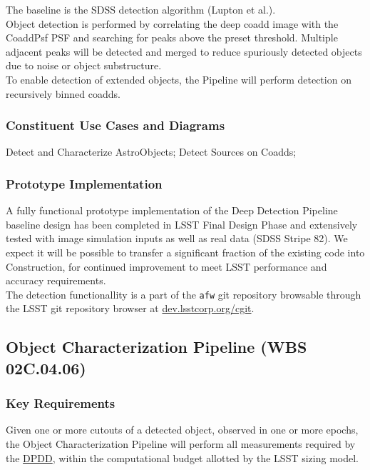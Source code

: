 \documentclass[12pt]{article}
\newcommand{\ds}[2]{{\color{blue} \href{https://docushare.lsstcorp.org/docushare/dsweb/Get/#1}{#2}}\xspace}
\newcommand{\DPDD}{\ds{LSE-163}{DPDD}}
\newcommand{\wbsObjChar}{WBS 02C.04.06}
\begin{document}
The baseline is the SDSS detection algorithm (Lupton et al.).
\\

Object detection is performed by correlating the deep coadd image with the CoaddPsf PSF and searching for peaks above the preset threshold. Multiple adjacent peaks will be detected and merged to reduce spuriously detected objects due to noise or object substructure.
\\

To enable detection of extended objects, the Pipeline will perform detection on recursively binned coadds.

\subsubsection{Constituent Use Cases and Diagrams}

Detect and Characterize AstroObjects;
Detect Sources on Coadds;

\subsubsection{Prototype Implementation}

A fully functional prototype implementation of the Deep Detection Pipeline baseline design has been completed in LSST Final Design Phase and extensively tested with image simulation inputs as well as real data (SDSS Stripe 82). We expect it will be possible to transfer a significant fraction of the existing code into Construction, for continued improvement to meet LSST performance and accuracy requirements. %
\\

The detection functionallity is a part of the {\tt afw} git repository browsable through the LSST git repository browser at \url{dev.lsstcorp.org/cgit}.

\clearpage

\subsection{Object Characterization Pipeline (\wbsObjChar)}

\subsubsection{Key Requirements}

Given one or more cutouts of a detected object, observed in one or more epochs, the Object Characterization Pipeline will perform all measurements required by the \DPDD, within the computational budget allotted by the LSST sizing model.
\\
\end{document}

